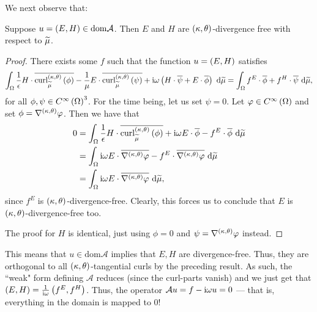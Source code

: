 \documentclass[11pt]{report}
\renewcommand{\ktcurl}[1]{\mathrm{curl}^{\kt}_{\dddmes}\bracs{#1}}
\newcommand{\aop}{\mathcal{A}}
\begin{document}
We next observe that:
\begin{prop}
	Suppose $u=\bracs{E,H}\in\mathrm{dom}\aop$. 
	Then $E$ and $H$ are $\left( \kappa, \theta \right)$-divergence free with respect to $\widetilde{\mu}$.
\end{prop} 
\begin{proof}
	There exists some $f$ such that the function $u=\left( E,H \right)$ satisfies
	\begin{align*}
		\integral{\ddom}{ \recip{\epsilon}H\cdot\overline{\ktcurl{\phi}} - \recip{\mu}E\cdot\overline{\ktcurl{\psi}} + \rmi\omega\bracs{H\cdot\overline{\psi} + E\cdot\overline{\phi}} }{\dddmes}
		= \integral{\ddom}{f^E\cdot\overline{\phi} + f^H\cdot\overline{\psi}}{\dddmes},
	\end{align*}
	for all $\phi,\psi\in C^{\infty}\left( \Omega \right)^3$.
	For the time being, let us set $\psi=0$.
	Let $\varphi\in C^{\infty}\left( \Omega \right)$ and set $\phi = \nabla^{\left( \kappa, \theta \right)}\varphi$.
	Then we have that
	\begin{align*}
		0 &= \integral{\ddom}{ \recip{\epsilon}H\cdot\overline{\ktcurl{\phi}} + \rmi\omega E\cdot\overline{\phi} - f^E\cdot\overline{\phi} }{\dddmes} \\
		&= \integral{\ddom}{ \rmi\omega E\cdot\overline{\ktgrad\varphi} - f^E\cdot\overline{\ktgrad\varphi} }{\dddmes} \\
		&= \integral{\ddom}{ \rmi\omega E\cdot\overline{\ktgrad\varphi} }{\dddmes},
	\end{align*}	 
	since $f^E$ is $\left( \kappa, \theta \right)$-divergence-free.
	Clearly, this forces us to conclude that $E$ is $\left( \kappa, \theta \right)$-divergence-free too.
	
	The proof for $H$ is identical, just using $\phi=0$ and $\psi=\nabla^{\left( \kappa, \theta \right)}\varphi$ instead.
\end{proof}

This means that $u\in\mathrm{dom}\aop$ implies that $E,H$ are divergence-free.
Thus, they are orthogonal to all $\left( \kappa, \theta \right)$-tangential curls by the preceding result.
As such, the ``weak" form defining $\aop$ reduces (since the curl-parts vanish) and we just get that $\left( E,H \right)=\frac{1}{\mathrm{i}\omega}\left( f^E,f^H \right)$.
Thus, the operator $\aop u = f - \rmi\omega u = 0$ --- that is, everything in the domain is mapped to 0!
\end{document}
